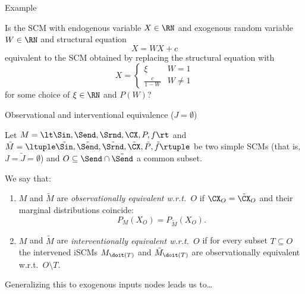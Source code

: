 \begin{frame}{Example}
\begin{Eg}
  Is the SCM with endogenous variable $X \in \RN$ and exogenous random variable $W \in \RN$ and structural equation
  $$X = W X + c$$
  equivalent to the SCM obtained by replacing the structural equation with
  $$X = \begin{cases}
          \xi & W = 1 \\
          \frac{c}{1 - W} & W \ne 1
        \end{cases}$$
  for some choice of $\xi \in \RN$ and $P(W)$?

  \bigskip
\end{Eg}
\end{frame}

\begin{frame}{Observational and interventional equivalence ($J=\emptyset$)}
  \begin{Def}[SCMs]
  Let $M = \lt \Sin, \Send, \Srnd, \CX, P, f \rt$ and
  $\tilde{M} = \ltuple \tilde{\Sin}, \tilde{\Send}, \tilde{\Srnd}, \tilde{\CX}, \tilde{P}, \tilde{f} \rtuple$ be two simple SCMs
  (that is, $J = \tilde{J} = \emptyset$) and $O \subseteq \Send \cap \tilde{\Send}$ a common subset.

  We say that:
  \begin{enumerate}
    \item $M$ and $\tilde{M}$ are \emph{observationally equivalent w.r.t.\ $O$} if $\CX_O = \tilde{\CX}_O$ and their marginal distributions coincide:
      $$P_{M}(X_O) = P_{\tilde{M}}(X_O).$$
    \item $M$ and $\tilde{M}$ are \emph{interventionally equivalent w.r.t.\ $O$} if for every subset $T \subseteq O$ the intervened iSCMs $M_{\doit(T)}$ and $\tilde{M}_{\doit(T)}$ are observationally equivalent w.r.t.\ $O \setminus T$.
  \end{enumerate}
\end{Def}
Generalizing this to exogenous inputs nodes leads us to\dots
\end{frame}


